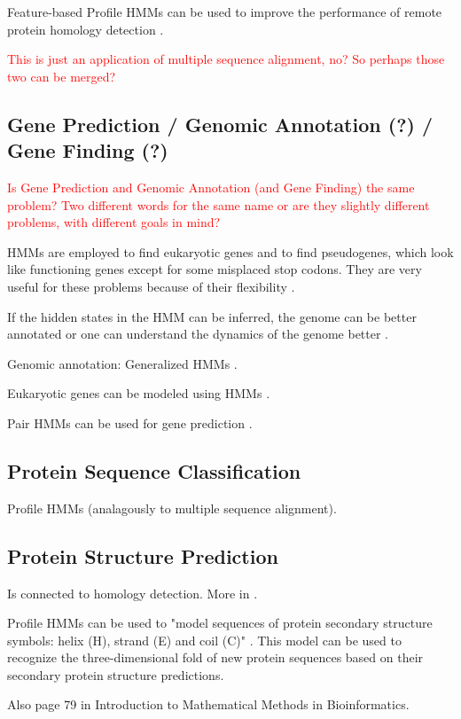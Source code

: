 \documentclass{article}
\begin{document}
Feature-based Profile HMMs can be used to improve the performance of remote protein homology detection \cite{Yoon2009}.

\textcolor{red}{This is just an application of multiple sequence alignment, no? So perhaps those two can be merged?}


\subsection{Gene Prediction / Genomic Annotation (?) / Gene Finding (?)}
\textcolor{red}{Is Gene Prediction and Genomic Annotation (and Gene Finding) the same problem? Two different words for the same name or are they slightly different problems, with different goals in mind?}

HMMs are employed to find eukaryotic genes and to find pseudogenes, which look like functioning genes except for some misplaced stop codons. They are very useful for these problems because of their flexibility \cite{Christianini2006}.

If the hidden states in the HMM can be inferred, the genome can be better annotated or one can understand the dynamics of the genome better \cite{Christianini2006}.

Genomic annotation: Generalized HMMs \cite{Choo2004}.

Eukaryotic genes can be modeled using HMMs \cite{Yoon2009}. 

Pair HMMs can be used for gene prediction \cite{Yoon2009}.


\subsection{Protein Sequence Classification}

Profile HMMs (analagously to multiple sequence alignment). 


\subsection{Protein Structure Prediction}
Is connected to homology detection. More in \cite{Choo2004}.

Profile HMMs can be used to "model sequences of protein secondary structure symbols: helix (H), strand (E) and coil (C)" \cite{Yoon2009}. This model can be used to recognize the three-dimensional fold of new protein sequences based on their secondary protein structure predictions. 

Also page 79 in Introduction to Mathematical Methods in Bioinformatics. 
\end{document}
